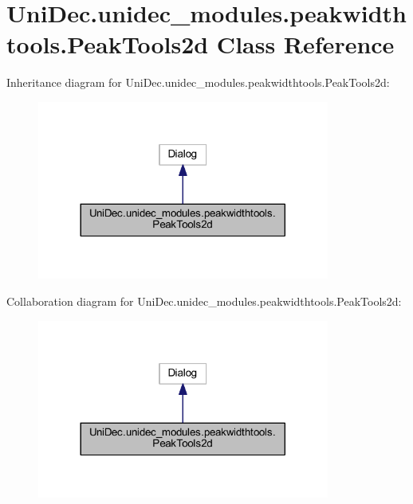 \hypertarget{class_uni_dec_1_1unidec__modules_1_1peakwidthtools_1_1_peak_tools2d}{}\section{Uni\+Dec.\+unidec\+\_\+modules.\+peakwidthtools.\+Peak\+Tools2d Class Reference}
\label{class_uni_dec_1_1unidec__modules_1_1peakwidthtools_1_1_peak_tools2d}


Inheritance diagram for Uni\+Dec.\+unidec\+\_\+modules.\+peakwidthtools.\+Peak\+Tools2d\+:\nopagebreak
\begin{figure}[H]
\begin{center}
\leavevmode
\includegraphics[width=272pt]{class_uni_dec_1_1unidec__modules_1_1peakwidthtools_1_1_peak_tools2d__inherit__graph}
\end{center}
\end{figure}


Collaboration diagram for Uni\+Dec.\+unidec\+\_\+modules.\+peakwidthtools.\+Peak\+Tools2d\+:\nopagebreak
\begin{figure}[H]
\begin{center}
\leavevmode
\includegraphics[width=272pt]{class_uni_dec_1_1unidec__modules_1_1peakwidthtools_1_1_peak_tools2d__coll__graph}
\end{center}
\end{figure}
